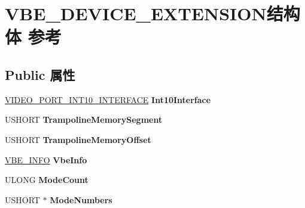 \hypertarget{struct_v_b_e___d_e_v_i_c_e___e_x_t_e_n_s_i_o_n}{}\section{V\+B\+E\+\_\+\+D\+E\+V\+I\+C\+E\+\_\+\+E\+X\+T\+E\+N\+S\+I\+O\+N结构体 参考}
\label{struct_v_b_e___d_e_v_i_c_e___e_x_t_e_n_s_i_o_n}
\subsection*{Public 属性}
\begin{DoxyCompactItemize}
\item 
\mbox{\label{struct_v_b_e___d_e_v_i_c_e___e_x_t_e_n_s_i_o_n_a04475bd4669d08a24c16b7fbb33051c5}} 
\hyperlink{struct___v_i_d_e_o___p_o_r_t___i_n_t10___i_n_t_e_r_f_a_c_e}{V\+I\+D\+E\+O\+\_\+\+P\+O\+R\+T\+\_\+\+I\+N\+T10\+\_\+\+I\+N\+T\+E\+R\+F\+A\+CE} {\bfseries Int10\+Interface}
\item 
\mbox{\label{struct_v_b_e___d_e_v_i_c_e___e_x_t_e_n_s_i_o_n_a3c6f26a12328533ce2ae0b5be4ca832e}} 
U\+S\+H\+O\+RT {\bfseries Trampoline\+Memory\+Segment}
\item 
\mbox{\label{struct_v_b_e___d_e_v_i_c_e___e_x_t_e_n_s_i_o_n_ab679094421f510cb44645ebaefed05eb}} 
U\+S\+H\+O\+RT {\bfseries Trampoline\+Memory\+Offset}
\item 
\mbox{\label{struct_v_b_e___d_e_v_i_c_e___e_x_t_e_n_s_i_o_n_ab985ed7d07330ca9ebad8b3a75234a86}} 
\hyperlink{struct_v_b_e___i_n_f_o}{V\+B\+E\+\_\+\+I\+N\+FO} {\bfseries Vbe\+Info}
\item 
\mbox{\label{struct_v_b_e___d_e_v_i_c_e___e_x_t_e_n_s_i_o_n_a3967278d9363b1926492be79037a64e9}} 
U\+L\+O\+NG {\bfseries Mode\+Count}
\item 
\mbox{\label{struct_v_b_e___d_e_v_i_c_e___e_x_t_e_n_s_i_o_n_ab1efe287e72f26042801151b2a4c2da4}} 
U\+S\+H\+O\+RT $\ast$ {\bfseries Mode\+Numbers}

\end{DoxyCompactItemize}

